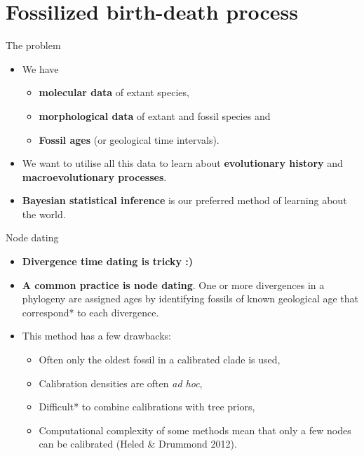 \section{Fossilized birth-death process}

\begin{frame}{The problem}

\begin{itemize}

\item We have 
\begin{itemize}
  \item \normalsize{{\bf molecular data} of extant species,} 
  \item \normalsize{{\bf morphological data} of extant and fossil species and }
  \item \normalsize{{\bf Fossil ages} (or geological time intervals).}
\end{itemize} 
\item We want to utilise all this data to learn about {\bf evolutionary history} and {\bf macroevolutionary processes}.
\item {\bf Bayesian statistical inference} is our preferred method of learning about the world.


\end{itemize}

\end{frame}




\begin{frame}{Node dating}

\begin{itemize}
\item {\bf Divergence time dating is tricky :) }
\item {\bf A common practice is node dating}. One or more divergences in a phylogeny are assigned ages by identifying fossils of known geological age that correspond* to each divergence. 
\item This method has a few drawbacks:
\begin{itemize}
\item Often only the oldest fossil in a calibrated clade is used,
\item Calibration densities are often {\it ad hoc},
\item Difficult* to combine calibrations with tree priors,
\item Computational complexity of some methods mean that only a few nodes can be calibrated (Heled \& Drummond 2012).
\end{itemize}
\end{itemize}

\end{frame}


